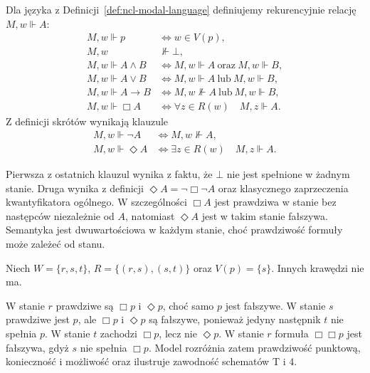 \begin{definicja}
\label{def:ncl-kripke-satisfaction}
Dla języka z Definicji~\ref{def:ncl-modal-language}
definiujemy rekurencyjnie relację $M,w\Vdash A$:
\[
\begin{aligned}
 M,w\Vdash p &\iff w\in V(p),\\
 M,w&\not\Vdash\bot,\\
 M,w\Vdash A\wedge B
   &\iff M,w\Vdash A\ \text{oraz}\ M,w\Vdash B,\\
 M,w\Vdash A\vee B
   &\iff M,w\Vdash A\ \text{lub}\ M,w\Vdash B,\\
 M,w\Vdash A\to B
   &\iff M,w\not\Vdash A\ \text{lub}\ M,w\Vdash B,\\
 M,w\Vdash\Box A
   &\iff \forall z\in R(w)\quad M,z\Vdash A.
\end{aligned}
\]
Z definicji skrótów wynikają klauzule
\[
\begin{aligned}
 M,w\Vdash\neg A&\iff M,w\not\Vdash A,\\
 M,w\Vdash\Diamond A&\iff
 \exists z\in R(w)\quad M,z\Vdash A.
\end{aligned}
\]
\end{definicja}
Pierwsza z ostatnich klauzul wynika z faktu,
że $\bot$ nie jest spełnione w żadnym stanie.
Druga wynika z definicji $\Diamond A=\neg\Box\neg A$
oraz klasycznego zaprzeczenia kwantyfikatora ogólnego.
W szczególności $\Box A$ jest prawdziwa w stanie
bez następców niezależnie od $A$, natomiast
$\Diamond A$ jest w takim stanie fałszywa.
Semantyka jest dwuwartościowa w każdym
stanie, choć prawdziwość formuły może
zależeć od stanu.

\begin{przyklad}
\label{ex:ncl-kripke-three-states}
Niech $W=\{r,s,t\}$, $R=\{(r,s),(s,t)\}$
oraz $V(p)=\{s\}$. Innych krawędzi nie ma.
\begin{center}
\end{center}
W stanie $r$ prawdziwe są $\Box p$ i $\Diamond p$,
choć samo $p$ jest fałszywe.
W stanie $s$ prawdziwe jest $p$, ale $\Box p$
i $\Diamond p$ są fałszywe, ponieważ jedyny
następnik $t$ nie spełnia $p$.
W stanie $t$ zachodzi $\Box p$, lecz nie $\Diamond p$.
W stanie $r$ formuła $\Box\Box p$ jest fałszywa,
gdyż $s$ nie spełnia $\Box p$.
Model rozróżnia zatem prawdziwość punktową,
konieczność i możliwość oraz ilustruje
zawodność schematów T i 4.
\end{przyklad}

